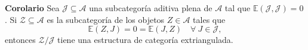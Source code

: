 \documentclass[preview]{standalone}
\begin{document}
\begin{center}
\justifying \textbf{Corolario} Sea $\mathscr{J}\subseteq\mathscr{A}$ una subcategoría aditiva plena de $\mathscr{A}$ tal que $\mathbb{E}(\mathscr{J}, \mathscr{J})=0$. Si $\mathscr{Z}\subseteq\mathscr{A}$ es la subcategoría de los objetos $Z\in\mathscr{A}$ tales que $$\mathbb{E}(Z,J) = 0 = \mathbb{E}(J,Z) \quad \forall \ J\in\mathscr{J},$$ entonces $\mathscr{Z}/\mathscr{J}$ tiene una estructura de categoría extriangulada.
\end{center}
\end{document}
